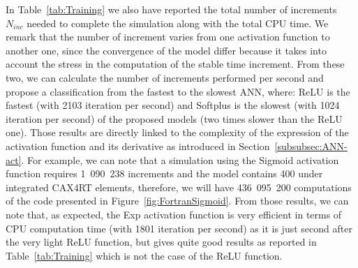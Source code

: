 \documentclass[algorithms,article,submit,pdftex,oneauthors]{Definitions/mdpi}
\begin{document}
In Table~\ref{tab:Training} we also have reported the total number of increments $N_{inc}$ needed to complete the simulation along with the total CPU time.
We remark that the number of increment varies from one activation function to another one, since the convergence of the model differ because it takes into account the stress in the computation of the stable time increment.
From these two, we can calculate the number of increments performed per second and propose a classification from the fastest to the slowest ANN, where: ReLU is the fastest (with 2103 iteration per second) and Softplus is the slowest (with 1024 iteration per second) of the proposed models (two times slower than the ReLU one).
Those results are directly linked to the complexity of the expression of the activation function and its derivative as introduced in Section~\ref{subsubsec:ANN-act}.
For example, we can note that a simulation using the Sigmoid activation function requires 1~090~238 increments and the model contains 400 under integrated CAX4RT elements, therefore, we will have 436~095~200 computations of the code presented in Figure~\ref{fig:FortranSigmoid}.
From those results, we can note that, as expected, the Exp activation function is very efficient in terms of CPU computation time (with 1801 iteration per second) as it is just second after the very light ReLU function, but gives quite good results as reported in Table~\ref{tab:Training} which is not the case of the ReLU function.
\end{document}
